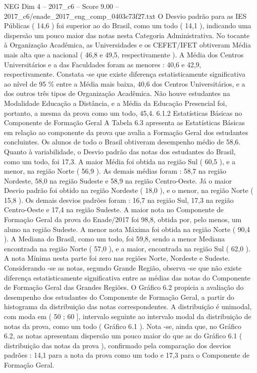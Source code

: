 \begin{textsample}{NEG Dim 4 – 2017\_c6 – Score 9.00 – 2017\_c6/enade\_2017\_eng\_comp\_0403c73f27.txt}
O Desvio padrão para as IES Públicas ( 14,6 ) foi superior ao do Brasil, como um todo ( 14,1 ), indicando uma dispersão um pouco maior das notas nesta Categoria Administrativa.
No tocante à Organização Acadêmica, as Universidades e os CEFET/IFET obtiveram Média mais alta que a nacional ( 46,8 e 49,5, respectivamente ).
A Média dos Centros Universitários e a das Faculdades foram as menores : 40,6 e 42,9, respectivamente.
Constata -se que existe diferença estatisticamente significativa ao nível de 95 \% entre a Média mais baixa, 40,6 dos Centros Universitários, e a dos outros três tipos de Organização Acadêmica.
Não houve estudantes na Modalidade Educação a Distância, e a Média da Educação Presencial foi, portanto, a mesma da prova como um todo, 45,4. 6.1.2 Estatísticas Básicas no Componente de Formação Geral A Tabela 6.3 apresenta as Estatísticas Básicas em relação ao componente da prova que avalia a Formação Geral dos estudantes concluintes.
Os alunos de todo o Brasil obtiveram desempenho médio de 58,6.
Quanto à variabilidade, o Desvio padrão das notas dos estudantes do Brasil, como um todo, foi 17,3.
A maior Média foi obtida na região Sul ( 60,5 ), e a menor, na região Norte ( 56,9 ).
As demais médias foram : 58,7 na região Nordeste, 58,0 na região Sudeste e 58,9 na região Centro-Oeste.
Já o maior Desvio padrão foi obtido na região Nordeste ( 18,0 ), e o menor, na região Norte ( 15,8 ).
Os demais desvios padrões foram : 16,7 na região Sul, 17,3 na região Centro-Oeste e 17,4 na região Sudeste.
A maior nota no Componente de Formação Geral da prova do Enade/2017 foi 98,8, obtida por, pelo menos, um aluno na região Sudeste.
A menor nota Máxima foi obtida na região Norte ( 90,4 ).
A Mediana do Brasil, como um todo, foi 59,8, sendo a menor Mediana encontrada na região Norte ( 57,0 ), e a maior, encontrada na região Sul ( 62,0 ).
A nota Mínima nesta parte foi zero nas regiões Norte, Nordeste e Sudeste.
Considerando -se as notas, segundo Grande Região, observa -se que não existe diferença estatisticamente significativa entre as médias das notas do Componente de Formação Geral das Grandes Regiões.
O Gráfico 6.2 propicia a avaliação do desempenho dos estudantes do Componente de Formação Geral, a partir do histograma da distribuição das notas correspondentes.
A distribuição é unimodal, com moda em ( 50 ; 60 ], intervalo seguinte ao intervalo modal da distribuição de notas da prova, como um todo ( Gráfico 6.1 ).
Nota -se, ainda que, no Gráfico 6.2, as notas apresentam dispersão um pouco maior do que as do Gráfico 6.1 ( distribuição das notas da prova ), confirmado pela comparação dos desvios padrões : 14,1 para a nota da prova como um todo e 17,3 para o Componente de Formação Geral.

\end{textsample}
